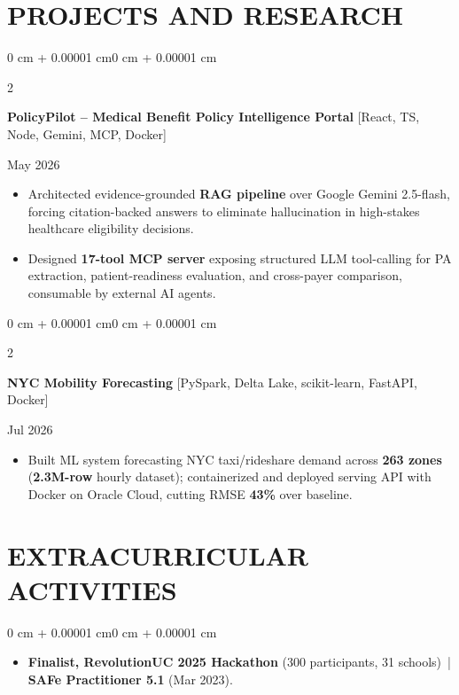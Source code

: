 \documentclass[10pt, letterpaper]{article}
\newenvironment{highlights}{
    \begin{itemize}[
        topsep=0.10 cm,
        parsep=0.06 cm,
        partopsep=0pt,
        itemsep=0.06 cm,
        leftmargin=12pt
    ]
}{
    \end{itemize}
}
\newenvironment{onecolentry}{
    \begin{adjustwidth}{0 cm + 0.00001 cm}{0 cm + 0.00001 cm}
}{
    \end{adjustwidth}
}
\newenvironment{twocolentry}[2][]{
    \onecolentry
    \def\secondColumn{#2}
    \setcolumnwidth{\fill, 4.5 cm}
    \begin{paracol}{2}
}{
    \switchcolumn \raggedleft \secondColumn
    \end{paracol}
    \endonecolentry
}
\begin{document}
\section{PROJECTS AND RESEARCH}
\begin{twocolentry}{May 2026}
\textbf{PolicyPilot -- Medical Benefit Policy Intelligence Portal} [React, TS, Node, Gemini, MCP, Docker]
\end{twocolentry}
\begin{highlights}
  \item Architected evidence-grounded \textbf{RAG pipeline} over Google Gemini 2.5-flash, forcing citation-backed answers to eliminate hallucination in high-stakes healthcare eligibility decisions.
  \item Designed \textbf{17-tool MCP server} exposing structured LLM tool-calling for PA extraction, patient-readiness evaluation, and cross-payer comparison, consumable by external AI agents.
\end{highlights}

\vspace{0.12 cm}

\begin{twocolentry}{Jul 2026}
\textbf{NYC Mobility Forecasting} [PySpark, Delta Lake, scikit-learn, FastAPI, Docker]
\end{twocolentry}
\begin{highlights}
  \item Built ML system forecasting NYC taxi/rideshare demand across \textbf{263 zones} (\textbf{2.3M-row} hourly dataset); containerized and deployed serving API with Docker on Oracle Cloud, cutting RMSE \textbf{43\%} over baseline.
\end{highlights}

\section{EXTRACURRICULAR ACTIVITIES}
\begin{onecolentry}
\begin{highlights}
  \item \textbf{Finalist, RevolutionUC 2025 Hackathon} (300 participants, 31 schools) \,|\, \textbf{SAFe Practitioner 5.1} (Mar 2023).
\end{highlights}
\end{onecolentry}
\end{document}
